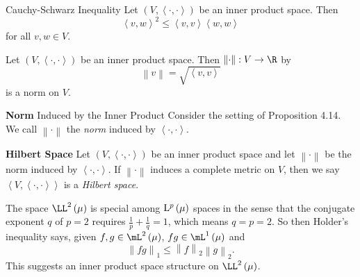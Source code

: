 \documentclass[pmath450]{subfiles}
\begin{document}
    \begin{prop}{Cauchy-Schwarz Inequality}
        Let $\left( V,\left\langle \cdot, \cdot\right\rangle \right)$ be an inner product space. Then
        \begin{equation*}
            \left\langle v, w\right\rangle^{2} \leq \left\langle v, v\right\rangle\left\langle w, w\right\rangle
        \end{equation*}
        for all $v,w\in V$.
    \end{prop}

    \placeqed[MATH 245]
    
    \begin{prop}{}
        Let $\left( V,\left\langle \cdot, \cdot\right\rangle \right)$ be an inner product space. Then $\left\lVert \cdot\right\rVert:V\to\R$ by
        \begin{equation*}
            \left\lVert v\right\rVert = \sqrt{\left\langle v, v\right\rangle}
        \end{equation*}
        is a norm on $V$.
    \end{prop}
    
    \placeqed[MATH 245]
    
    \begin{recall}{\textbf{Norm} Induced by the Inner Product}
        Consider the setting of Proposition 4.14. We call $\left\lVert \cdot\right\rVert$ the \emph{norm} induced by $\left\langle \cdot, \cdot\right\rangle$.
    \end{recall}
    
    \begin{definition}{\textbf{Hilbert Space}}
        Let $\left( V,\left\langle \cdot, \cdot\right\rangle \right)$ be an inner product space and let $\left\lVert \cdot\right\rVert$ be the norm induced by $\left\langle \cdot, \cdot\right\rangle$. If $\left\lVert \cdot\right\rVert$ induces a complete metric on $V$, then we say $\left\langle V, \left\langle \cdot, \cdot\right\rangle\right\rangle$ is a \emph{Hilbert space}.
    \end{definition}

    \np The space $\LL^{2}\left( \mu \right)$ is special among $\operatorname{L^{\text{$p$}}}\left( \mu \right)$ spaces in the sense that the conjugate exponent $q$ of $p=2$ requires $\frac{1}{p}+\frac{1}{q}=1$, which means $q=p=2$. So then Holder's inequality says, given $f,g\in\mL^{2}\left( \mu \right)$, $fg\in\lone\left( \mu \right)$ and
    \begin{equation*}
        \left\lVert fg \right\rVert_{1} \leq \left\lVert f\right\rVert_2 \left\lVert g\right\rVert_2.
    \end{equation*}
    This suggests an inner product space structure on $\LL^{2}\left( \mu \right)$.
    
\end{document}
